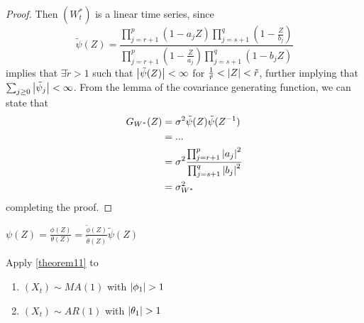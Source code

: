 \begin{proof}
    Then $(W_t^*)$ is a linear time series, since
    \[
        \tilde{\psi}(Z)=\frac{\prod_{j=r+1}^p(1-a_jZ)\prod_{j=s+1}^q\left(1-\frac{Z}{b_j}\right)}{\prod_{j=r+1}^p\left(1-\frac{Z}{a_j}\right)\prod_{j=s+1}^q(1-b_jZ)}
    \]
    implies that $\exists\tilde{r}>1$ such that $\left|\tilde{\psi}(Z)\right|<\infty$ for $\frac{1}{\tilde{r}}<\left|Z\right|<\tilde{r}$, further implying that $\sum_{j\ge0}\left|\tilde{\psi}_j\right|<\infty$. From the lemma of the covariance generating function, we can state that
    \begin{equation*}
        \begin{split}
            G_{W^*}(Z)&=\sigma^2\tilde{\psi}(Z)\tilde{\psi}(Z^{-1})\\
            &=...\\
            &=\sigma^2\frac{\prod_{j=r+1}^p\left|a_j\right|^2}{\prod_{j=s+1}^q\left|b_j\right|^2}\\
            &=\sigma_{W^*}^2\\
        \end{split}
    \end{equation*}
    completing the proof.
\end{proof}

\begin{remark}
    $\psi(Z)=\frac{\phi(Z)}{\theta(Z)}=\frac{\tilde{\phi}(Z)}{\tilde{\theta}(Z)}\tilde{\psi}(Z)$
\end{remark}

\begin{exercise}
    Apply \ref{theorem11} to
    \begin{enumerate}
        \item $(X_t)\sim MA(1)$ with $\abs{\phi_1}>1$
        \item $(X_t)\sim AR(1)$ with $\abs{\theta_1}>1$
    \end{enumerate}
\end{exercise}